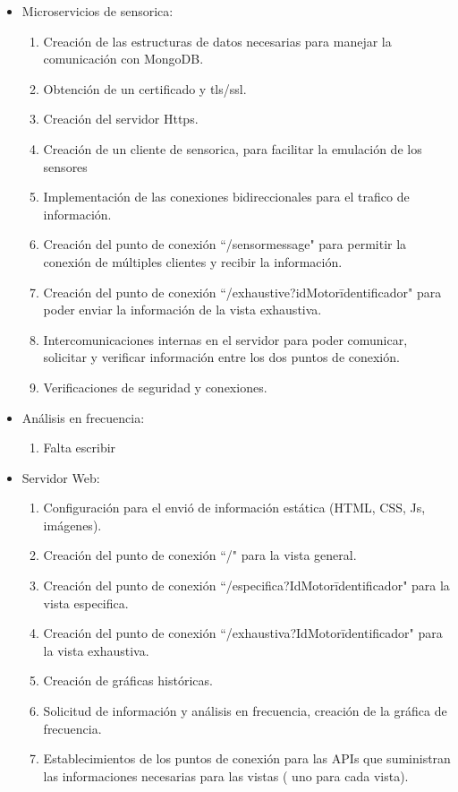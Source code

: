 \begin{itemize}
    \item Microservicios de sensorica:
        \begin{enumerate}
            \item Creación de las estructuras de datos necesarias para manejar
                la comunicación con MongoDB.
            \item Obtención de un certificado y tls/ssl.
            \item Creación del servidor Https.
            \item Creación de un cliente de sensorica, para facilitar la emulación
                de los sensores
            \item Implementación de las conexiones bidireccionales para el trafico
                de información.
            \item Creación del punto de conexión ``/sensormessage" para permitir
                la conexión de múltiples clientes y recibir la información.
            \item Creación del punto de conexión ``/exhaustive?idMotor\=identificador"
                para poder enviar la información de la vista exhaustiva.
            \item Intercomunicaciones internas en el servidor para poder comunicar,
                solicitar y verificar información entre los dos puntos de conexión.
            \item Verificaciones de seguridad y conexiones.
        \end{enumerate}

    \item Análisis en frecuencia:
        \begin{enumerate}
                \item Falta escribir
        \end{enumerate}

    \item Servidor Web:
        \begin{enumerate}
            \item Configuración para el envió de información estática
                (HTML, CSS, Js, imágenes).
            \item Creación del punto de conexión ``/" para la vista general.
            \item Creación del punto de conexión ``/especifica?IdMotor\= identificador"
                para la vista especifica.
            \item Creación del punto de conexión ``/exhaustiva?IdMotor\=identificador"
                para la vista exhaustiva.
            \item Creación de gráficas históricas.
            \item Solicitud de información y análisis en frecuencia, creación de
                la gráfica de frecuencia.
            \item Establecimientos de los puntos de conexión para las APIs que
                suministran las informaciones necesarias para las vistas (
                uno para cada vista).
        \end{enumerate}


\end{itemize}
